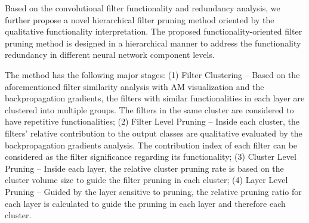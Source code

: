 \documentclass{article} %
\begin{document}
Based on the convolutional filter functionality and redundancy analysis, we further propose a novel hierarchical filter pruning method oriented by the qualitative functionality interpretation.
The proposed functionality-oriented filter pruning method is designed in a hierarchical manner to address the functionality redundancy in different neural network component levels.

The method has the following major stages:
	(1) Filter Clustering -- Based on the aforementioned filter similarity analysis with AM visualization and the backpropagation gradients, the filters with similar functionalities in each layer are clustered into multiple groups.
	The filters in the same cluster are considered to have repetitive functionalities;
	(2) Filter Level Pruning -- Inside each cluster, the filters' relative contribution to the output classes are qualitative evaluated by the backpropagation gradients analysis.
	The contribution index of each filter can be considered as the filter significance regarding its functionality;
	(3) Cluster Level Pruning -- Inside each layer, the relative cluster pruning rate is based on the cluster volume size to guide the filter pruning in each cluster;
	(4) Layer Level Pruning --  Guided by the layer sensitive to pruning, the relative pruning ratio for each layer is calculated to guide the pruning in each layer and therefore each cluster.
\end{document}
